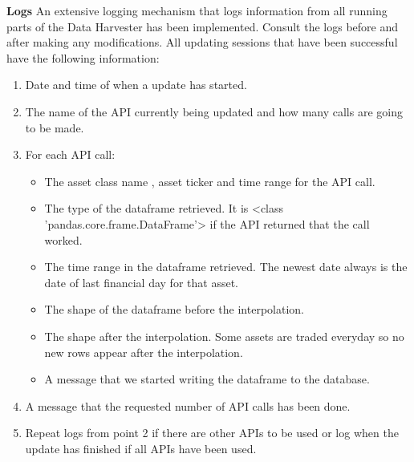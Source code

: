 \documentclass[main.tex]{subfiles}
\begin{document}
\textbf{Logs\newline}
An extensive logging mechanism that logs information from all running parts of the Data Harvester has been implemented. Consult the logs before and after making any modifications. All updating sessions that have been successful have the following information:
\begin{enumerate}
    \item Date and time of when a update has started.
    \item The name of the API currently being updated and how many calls are going to be made.
    \item For each API call: 
        \begin{itemize}
        \item The asset class name , asset ticker and time range for the API call.
        \item The type of the dataframe retrieved. It is <class 'pandas.core.frame.DataFrame'> if the API returned that the call worked.
        \item The time range in the dataframe retrieved. The newest date always is the date of last financial day for that asset.
        \item The shape of the dataframe before the interpolation.
        \item The shape after the interpolation. Some assets are traded everyday so no new rows appear after the interpolation.
        \item A message that we started writing the dataframe to the database.
    \end{itemize}
    \item A message that the requested number of API calls has been done.
    \item Repeat logs from point 2 if there are other APIs to be used or log when the update has finished if all APIs have been used.
    
\end{enumerate}
\end{document}
